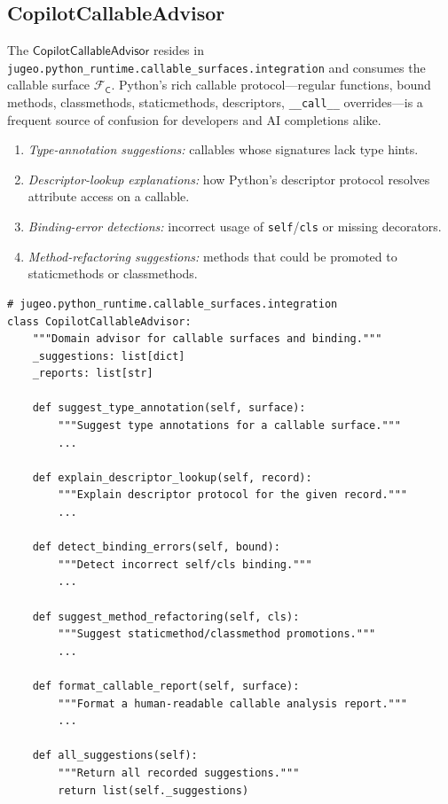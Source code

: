 \documentclass[11pt]{article}
\newcommand{\CallSurf}{\mathcal{F}_{\mathsf{C}}}
\begin{document}
\subsection{CopilotCallableAdvisor}\label{sec:callable-advisor}

The $\mathsf{CopilotCallableAdvisor}$ resides in
\texttt{jugeo.python\_runtime.callable\_surfaces.integration} and
consumes the callable surface $\CallSurf$.  Python's rich callable
protocol—regular functions, bound methods, classmethods, staticmethods,
descriptors, \texttt{\_\_call\_\_} overrides—is a frequent source of
confusion for developers and AI completions alike.

\begin{definition}\label{def:callable-cat}
\begin{enumerate}
  \item \emph{Type-annotation suggestions:} callables whose signatures
    lack type hints.
  \item \emph{Descriptor-lookup explanations:} how Python's descriptor
    protocol resolves attribute access on a callable.
  \item \emph{Binding-error detections:} incorrect usage of
    \texttt{self}/\texttt{cls} or missing decorators.
  \item \emph{Method-refactoring suggestions:} methods that could be
    promoted to staticmethods or classmethods.
\end{enumerate}
\end{definition}

\begin{lstlisting}[style=jugeo-python, caption={$\mathsf{CopilotCallableAdvisor}$ interface.}, label={lst:callable-advisor}]
# jugeo.python_runtime.callable_surfaces.integration
class CopilotCallableAdvisor:
    """Domain advisor for callable surfaces and binding."""
    _suggestions: list[dict]
    _reports: list[str]

    def suggest_type_annotation(self, surface):
        """Suggest type annotations for a callable surface."""
        ...

    def explain_descriptor_lookup(self, record):
        """Explain descriptor protocol for the given record."""
        ...

    def detect_binding_errors(self, bound):
        """Detect incorrect self/cls binding."""
        ...

    def suggest_method_refactoring(self, cls):
        """Suggest staticmethod/classmethod promotions."""
        ...

    def format_callable_report(self, surface):
        """Format a human-readable callable analysis report."""
        ...

    def all_suggestions(self):
        """Return all recorded suggestions."""
        return list(self._suggestions)
\end{lstlisting}
\end{document}

